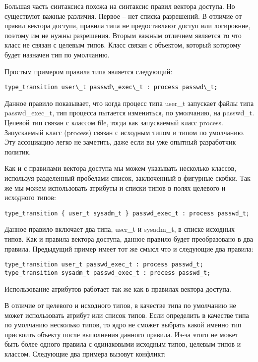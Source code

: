 \documentclass{./../class/UIR}
\begin{document}
Большая часть синтаксиса похожа на синтаксис правил вектора доступа. Но существуют важные различия. Первое – нет списка разрешений. В отличие от правил вектора доступа, правила типа не предоставляют доступ или логировние, поэтому им не нужны разрешения. Вторым важным отличием является то что класс не связан с целевым типов. Класс связан с объектом, который которому будет назначен тип по умолчанию.

Простым примером правила типа является следующий:

\begin{verbatim}
type_transition user\_t passwd\_exec\_t : process passwd\_t;
\end{verbatim}

Данное правило показывает, что когда процесс типа user\_t запускает файлы типа
passwd\_exec\_t, тип процесса пытается измениться, по умолчанию, на passwd\_t.
Целевой тип связан с классом file, тогда как запускаемый класс process. Запускаемый класс (process) связан с исходным типом и типом по умолчанию. Эту ассоциацию легко не заметить, даже если вы уже опытный разработчик политик.

Как и с правилами вектора доступа мы можем указывать несколько классов,
используя разделенный пробелами список, заключенный в фигурные скобки. Так же мы
можем использовать атрибуты и списки типов в полях целевого и исходного типов:

\begin{verbatim}
type_transition { user_t sysadm_t } passwd_exec_t : process passwd_t;
\end{verbatim}

Данное правило включает два типа, user\_t и sysadm\_t, в списке исходных типов.
Как и правила вектора доступа, данное правило будет преобразовано в два правила.
Предыдущий пример имеет тот же смысл что и следующие два правила:

\begin{verbatim}
type_transition user_t passwd_exec_t : process passwd_t;
type_transition sysadm_t passwd_exec_t : process passwd_t;
\end{verbatim}

Использование атрибутов работает так же как в правилах вектора доступа.

В отличие от целевого и исходного типов, в качестве типа по умолчанию не может
использовать атрибут или список типов. Если определить в качестве типа по
умолчанию несколько типов, то ядро не сможет выбрать какой именно тип присвоить
объекту после выполнения данного правила. Из-за этого не может быть более одного
правила с одинаковыми исходным типов, целевым типов и классом. Следующие два
примера вызовут конфликт:
\end{document}
